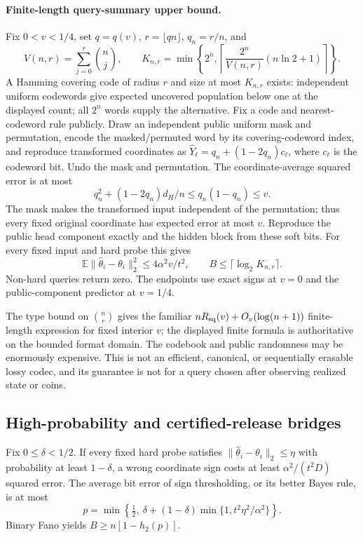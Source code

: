 \paragraph{Finite-length query-summary upper bound.}
Fix $0<v<1/4$, set $q=q(v)$, $r=\lfloor qn\rfloor$, $q_n=r/n$, and
\[
 V(n,r)=\sum_{j=0}^{r}\binom nj,\qquad
 K_{n,r}=\min\left\{2^n,
 \left\lceil\frac{2^n}{V(n,r)}(n\ln2+1)\right\rceil\right\}.
\]
A Hamming covering code of radius $r$ and size at most $K_{n,r}$ exists:
independent uniform codewords give expected uncovered population below
one at the displayed count; all $2^n$ words supply the alternative.
Fix a code and nearest-codeword rule publicly.  Draw an independent public
uniform mask and permutation, encode the masked/permuted word by its
covering-codeword index, and reproduce transformed coordinates as
$\widehat Y_\ell=q_n+(1-2q_n)c_\ell$, where $c_\ell$ is the codeword bit.
Undo the mask and permutation.
The coordinate-average squared error is at most
\[
 q_n^2+(1-2q_n)d_H/n\le q_n(1-q_n)\le v.
\]
The mask makes the transformed input independent of the permutation; thus
every fixed original coordinate has expected error at most $v$.  Reproduce
the public head component exactly and the hidden block from these soft
bits.  For every fixed input and hard probe this gives
\[
 \mathbb E\|\widehat\theta_i-\theta_i\|_2^2
 \le4\alpha^2v/t^2,\qquad B\le\lceil\log_2K_{n,r}\rceil.
\]
Non-hard queries return zero.  The endpoints use exact signs at $v=0$ and
the public-component predictor at $v=1/4$.

The type bound on $\binom nr$ gives the familiar
$nR_{\rm sq}(v)+O_v(\log(n+1))$ finite-length expression for fixed interior
$v$; the displayed finite formula is authoritative on the bounded format
domain.  The codebook and public randomness may be enormously expensive.
This is not an efficient, canonical, or sequentially erasable lossy codec,
and its guarantee is not for a query chosen after observing realized
state or coins.

\subsection{High-probability and certified-release bridges}
Fix $0\le\delta<1/2$.  If every fixed hard probe satisfies
$\|\widehat\theta_i-\theta_i\|_2\le\eta$
with probability at least $1-\delta$, a wrong coordinate sign costs at
least $\alpha^2/(t^2D)$ squared error.  The average bit error of sign
thresholding, or its better Bayes rule, is at most
\[
 p=\min\left\{\tfrac12,\ \delta+(1-\delta)
                              \min\{1,t^2\eta^2/\alpha^2\}\right\}.
\]
Binary Fano yields $B\ge n[1-h_2(p)]$.

